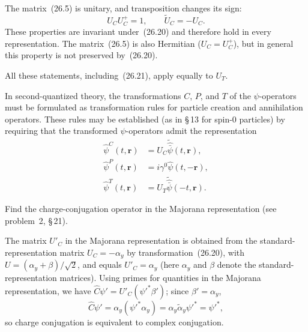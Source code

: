 The matrix~(26.5) is unitary, and transposition changes its sign:
\begin{equation}
U_CU^+_C = 1,\qquad \widetilde U_C = -U_C.
\tag{26.21}
\end{equation}
These properties are invariant under~(26.20) and therefore hold in every representation. The matrix~(26.5) is also Hermitian ($U_C = U^+_C$), but in general this property is not preserved by~(26.20).

All these statements, including~(26.21), apply equally to $U_T$.

In second-quantized theory, the transformations $C$, $P$, and $T$ of the $\psi$-operators must be formulated as transformation rules for particle creation and annihilation operators. These rules may be established (as in \S\,13 for spin-0 particles) by requiring that the transformed $\psi$-operators admit the representation
\begin{equation}
\begin{aligned}
\widehat\psi^C(t,\mathbf{r}) &= U_C\widetilde{\widehat{\bar\psi}}(t,\mathbf{r}),\\
\widehat\psi^P(t,\mathbf{r}) &= i\gamma^0\widehat\psi(t,-\mathbf{r}),\\
\widehat\psi^T(t,\mathbf{r}) &= U_T\widetilde{\widehat{\bar\psi}}(-t,\mathbf{r}).
\end{aligned}
\tag{26.22}
\end{equation}

\ProblemHeading

Find the charge-conjugation operator in the Majorana representation (see problem~2, \S\,21).

\SolutionHeading The matrix $U'_C$ in the Majorana representation is obtained from the standard-representation matrix $U_C = -\alpha_y$ by transformation~(26.20), with $U = (\alpha_y + \beta)/\sqrt{2}$, and equals $U'_C = \alpha_y$ (here $\alpha_y$ and $\beta$ denote the standard-representation matrices). Using primes for quantities in the Majorana representation, we have $\widehat C\psi' = U'_C(\psi'^*\beta')$; since $\beta' = \alpha_y$,
\[
\widehat C\psi' = \alpha_y(\psi'^*\alpha_y) = \alpha_y\widetilde\alpha_y\psi'^* = \psi'^*,
\]
so charge conjugation is equivalent to complex conjugation.
